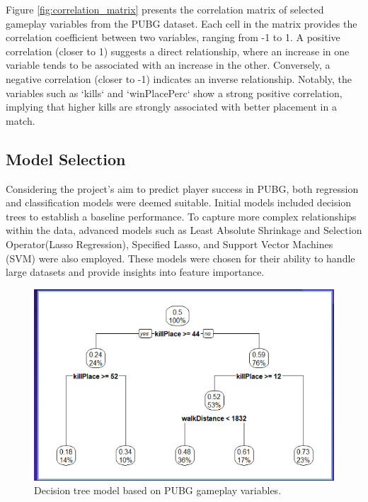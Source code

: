 \documentclass[12pt]{article}
\begin{document}
Figure \ref{fig:correlation_matrix} presents the correlation matrix of selected gameplay variables from the PUBG dataset. Each cell in the matrix provides the correlation coefficient between two variables, ranging from -1 to 1. A positive correlation (closer to 1) suggests a direct relationship, where an increase in one variable tends to be associated with an increase in the other. Conversely, a negative correlation (closer to -1) indicates an inverse relationship. Notably, the variables such as `kills` and `winPlacePerc` show a strong positive correlation, implying that higher kills are strongly associated with better placement in a match.






\subsection{Model Selection}
Considering the project's aim to predict player success in PUBG, both regression and classification models were deemed suitable. Initial models included decision trees to establish a baseline performance. To capture more complex relationships within the data, advanced models such as Least Absolute Shrinkage and Selection Operator(Lasso Regression), Specified Lasso, and Support Vector Machines (SVM) were also employed. These models were chosen for their ability to handle large datasets and provide insights into feature importance.


\begin{figure}[h]
	\centering
	\includegraphics[width=\linewidth]{tree.png} 
	\caption{Decision tree model based on PUBG gameplay variables.}
	\label{fig:decision_tree}
\end{figure}
\end{document}
